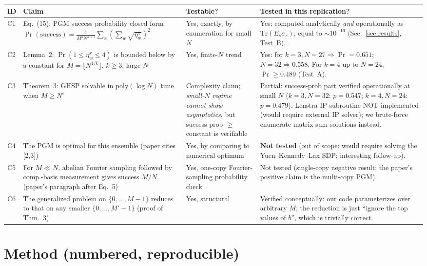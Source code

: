 \documentclass[11pt]{article}
\begin{document}
\begin{longtable}{@{}p{}p{}p{}p{}@{}}
\toprule
ID & Claim & Testable? & Tested in this replication? \\ \midrule
C1 & Eq.~(15): PGM success probability closed form $\Pr(\text{success})=\frac{1}{M^k N^{k+1}}\sum_x (\sum_w \sqrt{\eta_w^x})^2$ & Yes, exactly, by enumeration for small $N$ & Yes: computed analytically \emph{and} operationally as $\mathrm{Tr}(E_s\sigma_s)$; equal to $\sim 10^{-16}$ (Sec.~\ref{sec:results}, Test~B). \\
C2 & Lemma~2: $\Pr(1\le\eta_w^x\le 4)$ is bounded below by a constant for $M=\lfloor N^{1/k}\rfloor$, $k\ge 3$, large $N$ & Yes, finite-$N$ trend & Yes: for $k=3, N=27\Rightarrow \Pr=0.651$; $N=32\Rightarrow 0.558$. For $k=4$ up to $N=24$, $\Pr\ge 0.489$ (Test~A). \\
C3 & Theorem~3: GHSP solvable in poly$(\log N)$ time when $M\ge N^\varepsilon$ & Complexity claim; \emph{small-$N$ regime cannot show asymptotics}, but success prob $\ge$ constant is verifiable & Partial: success-prob part verified operationally at small $N$ ($k=3, N=32$: $p=0.547$; $k=4, N=24$: $p=0.479$). Lenstra IP subroutine NOT implemented (would require external IP solver); we brute-force enumerate matrix-sum solutions instead. \\
C4 & The PGM is optimal for this ensemble (paper cites [2,3]) & Yes, by comparing to numerical optimum & \textbf{Not tested} (out of scope: would require solving the Yuen--Kennedy--Lax SDP; interesting follow-up). \\
C5 & For $M\ll N$, abelian Fourier sampling followed by comp.-basis measurement gives success $M/N$ (paper's paragraph after Eq.~5) & Yes, one-copy Fourier-sampling probability check & Not tested (single-copy negative result; the paper's positive claim is the multi-copy PGM). \\
C6 & The generalized problem on $\{0,\dots,M-1\}$ reduces to that on any smaller $\{0,\dots,M'-1\}$ (proof of Thm.~3) & Yes, structural & Verified conceptually: our code parameterizes over arbitrary $M$; the reduction is just ``ignore the top values of $b$'', which is trivially correct. \\
\bottomrule
\end{longtable}

\section{Method (numbered, reproducible)}
\end{document}
